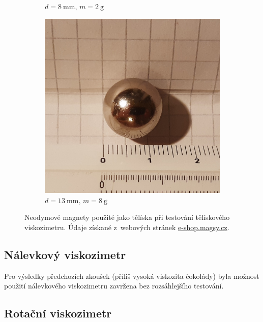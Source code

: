 \documentclass[12pt]{article}
\begin{document}
\begin{figure}
\begin{subfigure}[b]{.3\textwidth}
        \caption{$d = \SI{8}{\milli\metre}\text{, }m = \SI{2}{\gram}$}
    \end{subfigure}
    \hfill
    \begin{subfigure}[b]{.3\textwidth}
        \includegraphics[width = \textwidth]{figures/koule13.jpg}
        \caption{$d = \SI{13}{\milli\metre}\text{, }m = \SI{8}{\gram}$}
    \end{subfigure}
    \caption{Neodymové magnety použité jako tělíska při testování tělískového viskozimetru. Údaje získané z~webových stránek \url{e-shop.magsy.cz}.}
    \label{fig:koule}
\end{figure}

\subsection{Nálevkový viskozimetr}%

Pro výsledky předchozích zkoušek (příliš vysoká viskozita čokolády) byla možnost použití nálevkového viskozimetru zavržena bez rozsáhlejšího testování.

\subsection{Rotační viskozimetr}%
\end{document}
